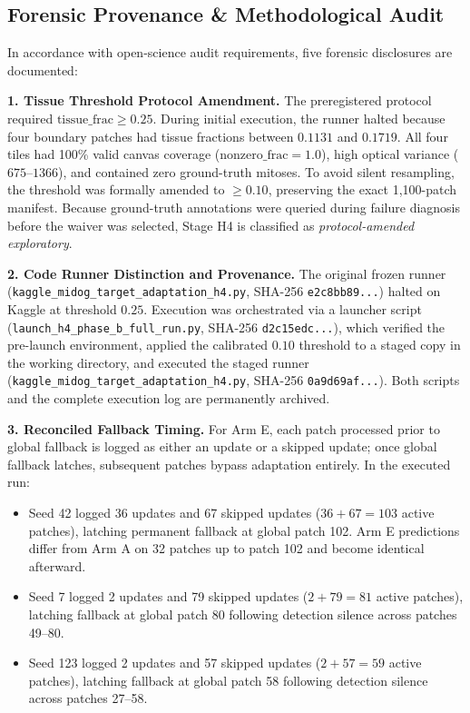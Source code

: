 \documentclass[conference]{IEEEtran}
\begin{document}
\subsection{Forensic Provenance \& Methodological Audit}
In accordance with open-science audit requirements, five forensic disclosures are documented:

\textbf{1. Tissue Threshold Protocol Amendment.}
The preregistered protocol required $\text{tissue\_frac} \ge 0.25$.
During initial execution, the runner halted because four boundary patches had tissue fractions between $0.1131$ and $0.1719$.
All four tiles had 100\% valid canvas coverage ($\text{nonzero\_frac} = 1.0$), high optical variance ($675$--$1366$), and contained zero ground-truth mitoses.
To avoid silent resampling, the threshold was formally amended to $\ge 0.10$, preserving the exact 1,100-patch manifest.
Because ground-truth annotations were queried during failure diagnosis before the waiver was selected, Stage H4 is classified as \emph{protocol-amended exploratory}.

\textbf{2. Code Runner Distinction and Provenance.}
The original frozen runner (\texttt{kaggle\_midog\_target\_adaptation\_h4.py}, SHA-256 \texttt{e2c8bb89...}) halted on Kaggle at threshold $0.25$.
Execution was orchestrated via a launcher script (\texttt{launch\_h4\_phase\_b\_full\_run.py}, SHA-256 \texttt{d2c15edc...}), which verified the pre-launch environment, applied the calibrated $0.10$ threshold to a staged copy in the working directory, and executed the staged runner (\texttt{kaggle\_midog\_target\_adaptation\_h4.py}, SHA-256 \texttt{0a9d69af...}).
Both scripts and the complete execution log are permanently archived.

\textbf{3. Reconciled Fallback Timing.}
For Arm E, each patch processed prior to global fallback is logged as either an update or a skipped update; once global fallback latches, subsequent patches bypass adaptation entirely.
In the executed run:
\begin{itemize}
\item Seed 42 logged 36 updates and 67 skipped updates ($36 + 67 = 103$ active patches), latching permanent fallback at global patch 102. Arm E predictions differ from Arm A on 32 patches up to patch 102 and become identical afterward.
\item Seed 7 logged 2 updates and 79 skipped updates ($2 + 79 = 81$ active patches), latching fallback at global patch 80 following detection silence across patches 49--80.
\item Seed 123 logged 2 updates and 57 skipped updates ($2 + 57 = 59$ active patches), latching fallback at global patch 58 following detection silence across patches 27--58.
\end{itemize}
\end{document}
